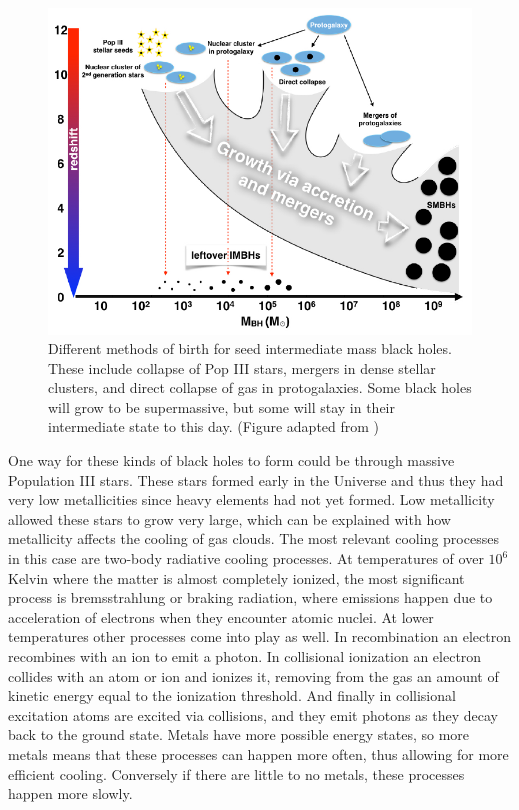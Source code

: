 \documentclass[english, oneside]{HYgradu}
\begin{document}
\begin{figure}
\centering
\includegraphics[width=\textwidth]{../images/imbhs.pdf}
\caption{Different methods of birth for seed intermediate mass black holes. These include collapse of Pop III stars, mergers in dense stellar clusters, and direct collapse of gas in protogalaxies. Some black holes will grow to be supermassive, but some will stay in their intermediate state to this day.
(Figure adapted from \citealt{mezcua:2017})}
\label{fig:imbhs}
\end{figure}

One way for these kinds of black holes to form could be through massive Population III stars. These stars formed early in the Universe and thus they had very low metallicities since heavy elements had not yet formed. Low metallicity allowed these stars to grow very large, which can be explained with how metallicity affects the cooling of gas clouds. 
The most relevant cooling processes in this case are two-body radiative cooling processes. At temperatures of over $10^6$ Kelvin where the matter is almost completely ionized, the most significant process is bremsstrahlung or braking radiation, where emissions happen due to acceleration of electrons when they encounter atomic nuclei. At lower temperatures other processes come into play as well. In recombination an electron recombines with an ion to emit a photon. In collisional ionization an electron collides with an atom or ion and ionizes it, removing from the gas an amount of kinetic energy equal to the ionization threshold. And finally in collisional excitation atoms are excited via collisions, and they emit photons as they decay back to the ground state. Metals have more possible energy states, so more metals means that these processes can happen more often, thus allowing for more efficient cooling. Conversely if there are little to no metals, these processes happen more slowly.
\end{document}
